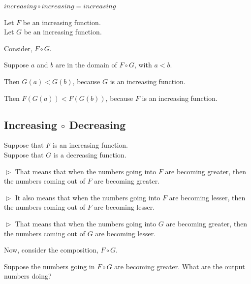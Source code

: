 \documentclass{ximera}
\begin{document}
\begin{fact}
$increasing \circ increasing = increasing$


Let $F$ be an increasing function. \\
Let $G$ be an increasing function. 


Consider, $F \circ G$.

Suppose $a$ and $b$ are in the domain of $F \circ G$, with $a < b$. 

Then $G(a) < G(b)$, because $G$ is an increasing function. 

Then $F(G(a)) < F(G(b))$, because $F$ is an increasing function.


\end{fact}































\subsection*{Increasing $\circ$ Decreasing}


Suppose that $F$ is an increasing function. \\
Suppose that $G$ is a decreasing function. 


$\vartriangleright$ That means that when the numbers going into $F$ are becoming greater, then the numbers coming out of $F$ are becoming greater. 

$\vartriangleright$ It also means that when the numbers going into $F$ are becoming lesser, then the numbers coming out of $F$ are becoming lesser. 



$\vartriangleright$ That means that when the numbers going into $G$ are becoming greater, then the numbers coming out of $G$ are becoming lesser. 



Now, consider the composition, $F \circ G$. 


Suppose the numbers going in $F \circ G$ are becoming greater.  What are the output numbers doing? 
\end{document}
